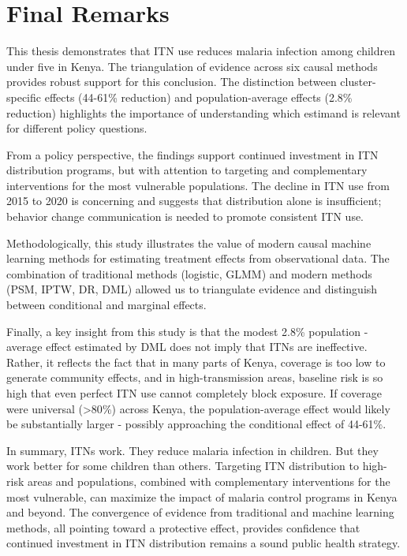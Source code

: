 \section{Final Remarks}

This thesis demonstrates that ITN use reduces malaria infection among children under five in Kenya. The triangulation of evidence across six causal methods provides robust support for this conclusion. The distinction between cluster-specific effects (44-61\% reduction) and population-average effects (2.8\% reduction) highlights the importance of understanding which estimand is relevant for different policy questions.

From a policy perspective, the findings support continued investment in ITN distribution programs, but with attention to targeting and complementary interventions for the most vulnerable populations. The decline in ITN use from 2015 to 2020 is concerning and suggests that distribution alone is insufficient; behavior change communication is needed to promote consistent ITN use.

Methodologically, this study illustrates the value of modern causal machine learning methods for estimating treatment effects from observational data. The combination of traditional methods (logistic, GLMM) and modern methods (PSM, IPTW, DR, DML) allowed us to triangulate evidence and distinguish between conditional and marginal effects.

Finally, a key insight from this study is that the modest 2.8\% population - average effect estimated by DML does not imply that ITNs are ineffective. Rather, it reflects the fact that in many parts of Kenya, coverage is too low to generate community effects, and in high-transmission areas, baseline risk is so high that even perfect ITN use cannot completely block exposure. If coverage were universal (>80$\%$) across Kenya, the population-average effect would likely be substantially larger - possibly approaching the conditional effect of 44-61$\%$.

In summary, ITNs work. They reduce malaria infection in children. But they work better for some children than others. Targeting ITN distribution to high-risk areas and populations, combined with complementary interventions for the most vulnerable, can maximize the impact of malaria control programs in Kenya and beyond. The convergence of evidence from traditional and machine learning methods, all pointing toward a protective effect, provides confidence that continued investment in ITN distribution remains a sound public health strategy.